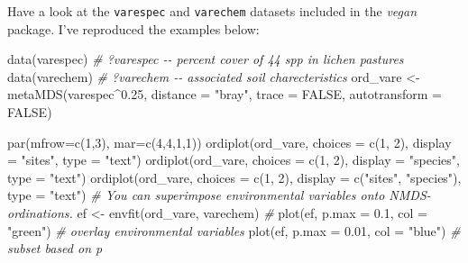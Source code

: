 \documentclass[
  11pt,
  a4paper,
]{book}
\newenvironment{Shaded}{\begin{snugshade}}{\end{snugshade}}
\newcommand{\AttributeTok}[1]{\textcolor[rgb]{0.77,0.63,0.00}{#1}}
\newcommand{\CommentTok}[1]{\textcolor[rgb]{0.56,0.35,0.01}{\textit{#1}}}
\newcommand{\ConstantTok}[1]{\textcolor[rgb]{0.00,0.00,0.00}{#1}}
\newcommand{\DecValTok}[1]{\textcolor[rgb]{0.00,0.00,0.81}{#1}}
\newcommand{\FloatTok}[1]{\textcolor[rgb]{0.00,0.00,0.81}{#1}}
\newcommand{\FunctionTok}[1]{\textcolor[rgb]{0.00,0.00,0.00}{#1}}
\newcommand{\NormalTok}[1]{#1}
\newcommand{\OtherTok}[1]{\textcolor[rgb]{0.56,0.35,0.01}{#1}}
\newcommand{\SpecialCharTok}[1]{\textcolor[rgb]{0.00,0.00,0.00}{#1}}
\newcommand{\StringTok}[1]{\textcolor[rgb]{0.31,0.60,0.02}{#1}}
\begin{document}
Have a look at the \texttt{varespec} and \texttt{varechem} datasets included in the \emph{vegan} package. I've reproduced the examples below:

\begin{Shaded}
\begin{Highlighting}[]
\FunctionTok{data}\NormalTok{(varespec) }\CommentTok{\# ?varespec {-}{-} percent cover of 44 spp in lichen pastures }
\FunctionTok{data}\NormalTok{(varechem) }\CommentTok{\# ?varechem {-}{-} associated soil charecteristics}
\NormalTok{ord\_vare }\OtherTok{\textless{}{-}} \FunctionTok{metaMDS}\NormalTok{(varespec}\SpecialCharTok{\^{}}\FloatTok{0.25}\NormalTok{, }\AttributeTok{distance =} \StringTok{"bray"}\NormalTok{, }
                   \AttributeTok{trace =} \ConstantTok{FALSE}\NormalTok{, }\AttributeTok{autotransform =} \ConstantTok{FALSE}\NormalTok{)}
\end{Highlighting}
\end{Shaded}

\begin{Shaded}
\begin{Highlighting}[]
\FunctionTok{par}\NormalTok{(}\AttributeTok{mfrow=}\FunctionTok{c}\NormalTok{(}\DecValTok{1}\NormalTok{,}\DecValTok{3}\NormalTok{), }\AttributeTok{mar=}\FunctionTok{c}\NormalTok{(}\DecValTok{4}\NormalTok{,}\DecValTok{4}\NormalTok{,}\DecValTok{1}\NormalTok{,}\DecValTok{1}\NormalTok{)) }
\FunctionTok{ordiplot}\NormalTok{(ord\_vare, }\AttributeTok{choices =} \FunctionTok{c}\NormalTok{(}\DecValTok{1}\NormalTok{, }\DecValTok{2}\NormalTok{), }\AttributeTok{display =} \StringTok{"sites"}\NormalTok{, }\AttributeTok{type =} \StringTok{"text"}\NormalTok{)}
\FunctionTok{ordiplot}\NormalTok{(ord\_vare, }\AttributeTok{choices =} \FunctionTok{c}\NormalTok{(}\DecValTok{1}\NormalTok{, }\DecValTok{2}\NormalTok{), }\AttributeTok{display =} \StringTok{"species"}\NormalTok{, }\AttributeTok{type =} \StringTok{"text"}\NormalTok{)}
\FunctionTok{ordiplot}\NormalTok{(ord\_vare, }\AttributeTok{choices =} \FunctionTok{c}\NormalTok{(}\DecValTok{1}\NormalTok{, }\DecValTok{2}\NormalTok{), }\AttributeTok{display =} \FunctionTok{c}\NormalTok{(}\StringTok{"sites"}\NormalTok{, }\StringTok{"species"}\NormalTok{),}
  \AttributeTok{type =} \StringTok{"text"}\NormalTok{)}
\CommentTok{\# You can superimpose environmental variables onto NMDS{-}ordinations.}
\NormalTok{ef }\OtherTok{\textless{}{-}} \FunctionTok{envfit}\NormalTok{(ord\_vare, varechem) }\CommentTok{\#}
\FunctionTok{plot}\NormalTok{(ef, }\AttributeTok{p.max =} \FloatTok{0.1}\NormalTok{, }\AttributeTok{col =} \StringTok{"green"}\NormalTok{) }\CommentTok{\# overlay environmental variables}
\FunctionTok{plot}\NormalTok{(ef, }\AttributeTok{p.max =} \FloatTok{0.01}\NormalTok{, }\AttributeTok{col =} \StringTok{"blue"}\NormalTok{) }\CommentTok{\# subset based on p}
\end{Highlighting}
\end{Shaded}
\end{document}
